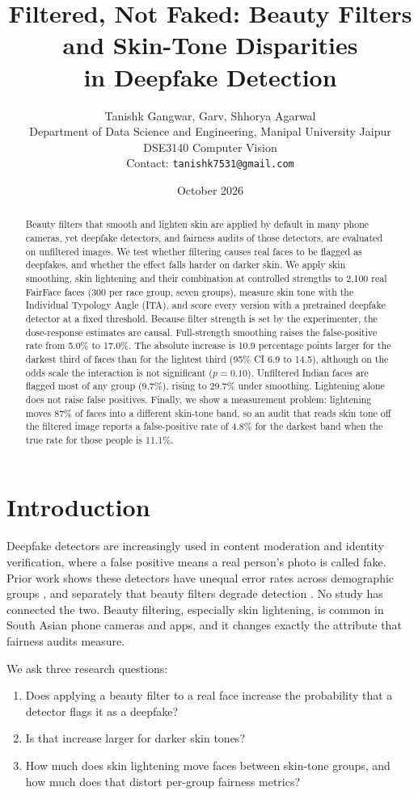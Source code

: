\documentclass[11pt]{article}
\title{Filtered, Not Faked: Beauty Filters and Skin-Tone Disparities\\in Deepfake Detection}
\author{Tanishk Gangwar, Garv, Shhorya Agarwal\\[4pt]
\small Department of Data Science and Engineering, Manipal University Jaipur\\
\small DSE3140 Computer Vision\\
\small Contact: \texttt{tanishk7531@gmail.com}}
\date{October 2026}
\begin{document}
\maketitle

\begin{abstract}
Beauty filters that smooth and lighten skin are applied by default in many phone cameras, yet deepfake detectors, and fairness audits of those detectors, are evaluated on unfiltered images. We test whether filtering causes real faces to be flagged as deepfakes, and whether the effect falls harder on darker skin. We apply skin smoothing, skin lightening and their combination at controlled strengths to 2,100 real FairFace faces (300 per race group, seven groups), measure skin tone with the Individual Typology Angle (ITA), and score every version with a pretrained deepfake detector at a fixed threshold. Because filter strength is set by the experimenter, the dose-response estimates are causal. Full-strength smoothing raises the false-positive rate from 5.0\% to 17.0\%. The absolute increase is 10.9 percentage points larger for the darkest third of faces than for the lightest third (95\% CI 6.9 to 14.5), although on the odds scale the interaction is not significant ($p=0.10$). Unfiltered Indian faces are flagged most of any group (9.7\%), rising to 29.7\% under smoothing. Lightening alone does not raise false positives. Finally, we show a measurement problem: lightening moves 87\% of faces into a different skin-tone band, so an audit that reads skin tone off the filtered image reports a false-positive rate of 4.8\% for the darkest band when the true rate for those people is 11.1\%.
\end{abstract}

\section{Introduction}
Deepfake detectors are increasingly used in content moderation and identity verification, where a false positive means a real person's photo is called fake. Prior work shows these detectors have unequal error rates across demographic groups \cite{trinh2021,hazirbas2021,xu2022}, and separately that beauty filters degrade detection \cite{libourel2024,concas2025}. No study has connected the two. Beauty filtering, especially skin lightening, is common in South Asian phone cameras and apps, and it changes exactly the attribute that fairness audits measure.

We ask three research questions:
\begin{enumerate}[label=\textbf{RQ\arabic*.}, leftmargin=*]
  \item Does applying a beauty filter to a real face increase the probability that a detector flags it as a deepfake?
  \item Is that increase larger for darker skin tones?
  \item How much does skin lightening move faces between skin-tone groups, and how much does that distort per-group fairness metrics?
\end{enumerate}
\end{document}
